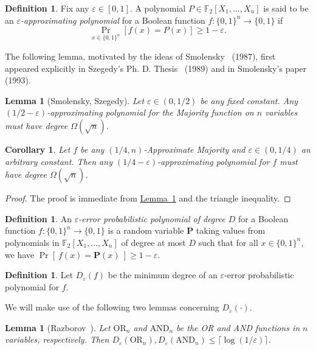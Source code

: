 \documentclass[11pt]{article}
\numberwithin{equation}{section}
\newtheorem{lemma}[theorem]{Lemma}
\newtheorem{corollary}[theorem]{Corollary}
\theoremstyle{definition}
\newtheorem{definition}[theorem]{Definition}
\theoremstyle{plain}
\newcommand{\expref}[2]{\hyperref[#2]{#1~\ref{#2}}}
\newcommand{\eps}{\varepsilon}
\newcommand{\mb}{\mathbf}
\newcommand{\prob}[2]{\mathop{\mathrm{Pr}}_{#1}[#2]}
\newcommand{\F}{\mathbb{F}}
\begin{document}
\begin{definition}
Fix any $\varepsilon\in [0,1]$. A polynomial $P\in \F_2[X_1,\ldots,X_n]$ is
said to be an \emph{$\varepsilon$-approximating polynomial} for a Boolean
function $f:\{0,1\}^n\rightarrow \{0,1\}$ if 
\[
\prob{x\in \{0,1\}^n}{f(x) = P(x)}\geq 1-\varepsilon.
\]
\end{definition}

%
The following lemma, motivated by the ideas of 
Smolensky~\cite{Smolensky87} (1987), first appeared explicitly in
Szegedy's Ph. D. Thesis~\cite[Theorem 2.4.7]{Szegedy1989} (1989)
and in Smolensky's paper~\cite[Theorem 5]{Smolensky93} (1993).

%
%

\begin{lemma}[Smolensky, Szegedy]
\label{lem:razb-maj}
Let $\varepsilon \in (0,{1}/{2})$ be any fixed constant. Any $(1/2-\varepsilon)$-approximating polynomial for the Majority function on $n$ variables must have degree $\Omega(\sqrt{n})$. 
\end{lemma}

\begin{corollary}
\label{cor:approx-maj-deg}
Let $f$ be any $(1/4,n)$-Approximate Majority and $\varepsilon\in (0,1/4)$ an arbitrary constant. Then any $({1}/{4}-\varepsilon)$-approximating polynomial for $f$ must have degree $\Omega(\sqrt{n})$.
\end{corollary}

\begin{proof}
The proof is immediate from \expref{Lemma}{lem:razb-maj} and the triangle inequality.
\end{proof}

\begin{definition}
An \emph{$\eps$-error probabilistic polynomial of degree $D$} for a Boolean function $f : \{0,1\}^n \to \{0,1\}$ is a random variable $\mb P$ taking values from polynomials in $\F_2[X_1,\ldots,X_n]$ of degree at most $D$ such that for all $x \in \{0,1\}^n$, we have $\Pr[\ f(x) = \mb P(x)\ ] \ge 1 - \eps$.
\end{definition}

\begin{definition}
Let $D_\eps(f)$ be the minimum degree of an $\eps$-error probabilistic polynomial for $f$.
\end{definition}

We will make use of the following two lemmas concerning $D_\eps(\cdot)$.

\begin{lemma}[Razborov~\cite{Razborov}]
\label{lem:razb-OR}
Let $\mathrm{OR}_n$ and $\mathrm{AND}_n$ be the OR and AND functions
%
in    %
$n$ variables, %
respectively.
%
Then $D_\varepsilon(\mathrm{OR}_n), D_\varepsilon(\mathrm{AND}_n)\leq \lceil \log(1/\varepsilon)\rceil$.
\end{lemma}
\end{document}
